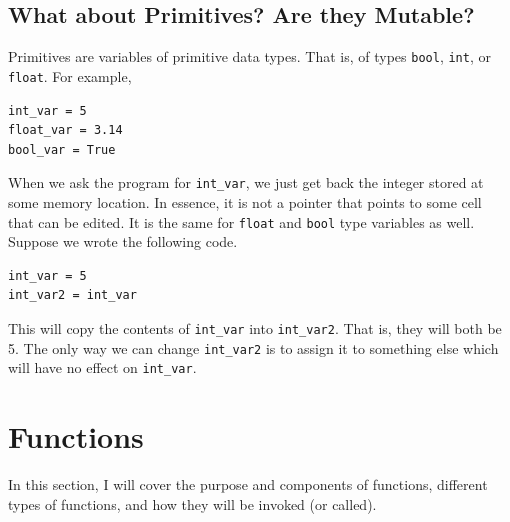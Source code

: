 \documentclass{article}
\begin{document}
\newpage

\subsection{What about Primitives? Are they Mutable?}
Primitives are variables of primitive data types. That is, of types \texttt{bool}, \texttt{int}, or \texttt{float}. For example,
\begin{verbatim}
int_var = 5
float_var = 3.14
bool_var = True
\end{verbatim}
When we ask the program for \texttt{int\_var}, we just get back the integer stored at some memory location. In essence, it is not a pointer that points to some cell that can be edited. It is the same for \texttt{float} and \texttt{bool} type variables as well. Suppose we wrote the following code.
\begin{verbatim}
int_var = 5
int_var2 = int_var
\end{verbatim}
This will copy the contents of \texttt{int\_var} into \texttt{int\_var2}. That is, they will both be 5. The only way we can change \texttt{int\_var2} is to assign it to something else which will have no effect on \texttt{int\_var}.

\section{Functions}
In this section, I will cover the purpose and components of functions, different types of functions, and how they will be invoked (or called).
\end{document}
